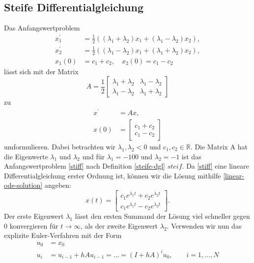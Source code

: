 \subsection{Steife Differentialgleichung}
\label{sec:steife-differentialgleichung}
Das Anfangswertproblem
\begin{align}
       \label{stiff}
       x_{1}^{\prime} &= \frac{1}{2} ((\lambda_1 + \lambda_2)x_1 + (\lambda_1 - \lambda_2)x_2), \nonumber \\
       x_{2}^{\prime} &= \frac{1}{2} ((\lambda_1 - \lambda_2)x_1 + (\lambda_1 + \lambda_2)x_2), \\
       x_1(0) &= c_1 + c_2, \quad x_2(0) = c_1 - c_2 \nonumber
\end{align}
lässt sich mit der Matrix
\[
       A = \frac{1}{2}
       \begin{bmatrix}
                \lambda_1 + \lambda_2 & \lambda_1 - \lambda_2 \\
                \lambda_1 - \lambda_2 & \lambda_1 + \lambda_2
       \end{bmatrix}
\]
zu
\begin{align*}
       x^{\prime} &= Ax, \\
       x(0) &=
       \begin{bmatrix}
              c_1 + c_2 \\
              c_1 - c_2
       \end{bmatrix}
\end{align*}
umformulieren. Dabei betrachten wir $\lambda_1, \lambda_2 < 0$ und $c_1, c_2 \in \mathbb{R}$. Die Matrix A hat die
Eigenwerte $\lambda_1$ und $\lambda_2$ und für $\lambda_1 = -100$ und $\lambda_2 = -1$ ist
das Anfangswertproblem \eqref{stiff} nach Definition \eqref{steife-dgl} $steif$. Da \eqref{stiff} eine lineare
Differentialgleichung erster Ordnung ist, können wir die Lösung mithilfe \eqref{linear-ode-solution} angeben:
\[
       x(t) =
       \begin{bmatrix}
              c_1 e^{\lambda_1 t} + c_2 e^{\lambda_2 t} \\
              c_1 e^{\lambda_1 t} - c_2 e^{\lambda_2 t}
       \end{bmatrix}.
\]
Der erste Eigenwert $\lambda_1$ lässt den ersten Summand der Lösung viel schneller gegen $0$ konvergieren für
$t \rightarrow \infty$, als der zweite Eigenwert $\lambda_2$. Verwenden wir nun das explizite Euler-Verfahren mit der
Form
\begin{align*}
       u_0 &= x_0 \\
       u_i &= u_{i-1} + hAu_{i-1}= \dots = (I + hA)^{i}u_0, \qquad i=1,\dots,N
\end{align*}
